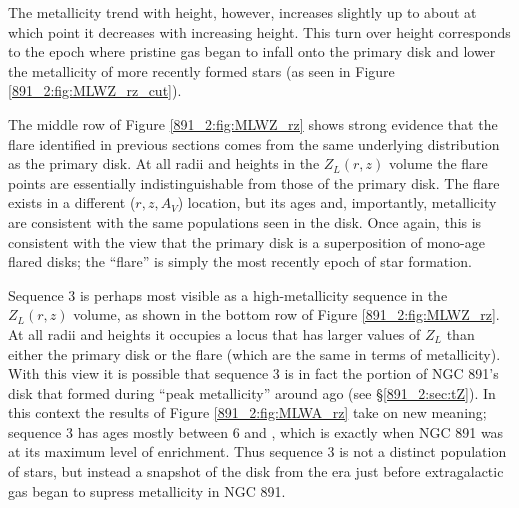 The metallicity trend with height, however, increases slightly up to
about  at which point it decreases with increasing
height. This turn over height corresponds to the epoch where pristine
gas began to infall onto the primary disk and lower the metallicity of
more recently formed stars (as seen in Figure
\ref{891_2:fig:MLWZ_rz_cut}).

The middle row of Figure \ref{891_2:fig:MLWZ_rz} shows strong evidence
that the flare identified in previous sections comes from the same
underlying distribution as the primary disk. At all radii and heights
in the $Z_L(r,z)$ volume the flare points are essentially
indistinguishable from those of the primary disk. The flare exists in
a different ($r,z,A_V$) location, but its ages and, importantly,
metallicity are consistent with the same populations seen in the
disk. Once again, this is consistent with the view that the primary
disk is a superposition of mono-age flared disks; the ``flare'' is
simply the most recently epoch of star formation.


Sequence 3 is perhaps most visible as a high-metallicity sequence in
the $Z_L(r,z)$ volume, as shown in the bottom row of Figure
\ref{891_2:fig:MLWZ_rz}. At all radii and heights it occupies a locus
that has larger values of $Z_L$ than either the primary disk or the
flare (which are the same in terms of metallicity). With this view it
is possible that sequence 3 is in fact the portion of NGC 891's disk
that formed during ``peak metallicity'' around  ago (see
\S\ref{891_2:sec:tZ}). In this context the results of Figure
\ref{891_2:fig:MLWA_rz} take on new meaning; sequence 3 has ages
mostly between 6 and , which is exactly when NGC 891 was
at its maximum level of enrichment. Thus sequence 3 is not a distinct
population of stars, but instead a snapshot of the disk from the era
just before extragalactic gas began to supress metallicity in NGC 891.



